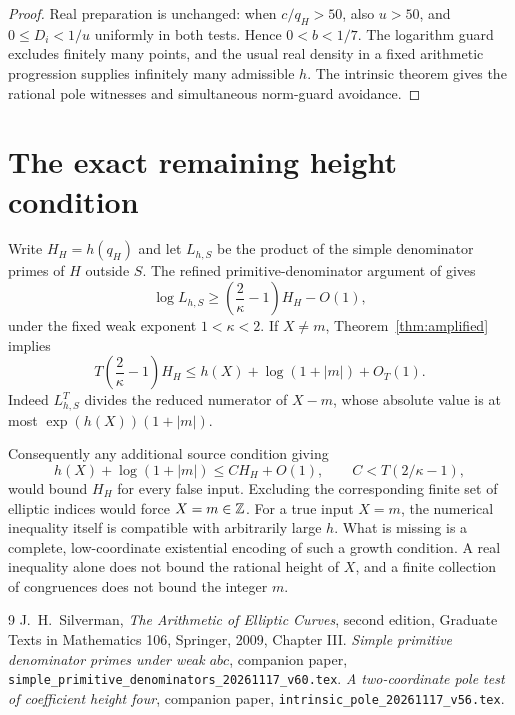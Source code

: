 \documentclass[11pt,a4paper]{article}
\begin{document}
\begin{proof}
Real preparation is unchanged: when $c/q_H>50$, also $u>50$,
and $0\le D_i<1/u$ uniformly in both tests. Hence $0<b<1/7$.
The logarithm guard excludes finitely many points, and the
usual real density in a fixed arithmetic progression supplies
infinitely many admissible $h$. The intrinsic theorem gives
the rational pole witnesses and simultaneous norm-guard avoidance.
\end{proof}

\section{The exact remaining height condition}

Write $H_H=h(q_H)$ and let $L_{h,S}$ be the product of the
simple denominator primes of $H$ outside $S$. The refined
primitive-denominator argument of \cite{Simple} gives
\[
 \log L_{h,S}\ge\left(\frac2\kappa-1\right)H_H-O(1),
\]
under the fixed weak exponent $1<\kappa<2$.
If $X\ne m$, Theorem~\ref{thm:amplified} implies
\begin{equation}\label{eq:remaining}
 T\left(\frac2\kappa-1\right)H_H
           \le h(X)+\log(1+|m|)+O_T(1).
\end{equation}
Indeed $L_{h,S}^T$ divides the reduced numerator of $X-m$,
whose absolute value is at most
$\exp(h(X))(1+|m|)$.

Consequently any additional source condition giving
\[
       h(X)+\log(1+|m|)\le C H_H+O(1),
       \qquad C<T(2/\kappa-1),
\]
would bound $H_H$ for every false input. Excluding the
corresponding finite set of elliptic indices would force
$X=m\in\mathbb Z$. For a true input $X=m$, the numerical inequality
itself is compatible with arbitrarily large $h$.
What is missing is a complete, low-coordinate existential
encoding of such a growth condition. A real inequality alone
does not bound the rational height of $X$, and a finite
collection of congruences does not bound the integer $m$.

\begin{thebibliography}{9}
J.~H.~Silverman, \emph{The Arithmetic of Elliptic Curves},
second edition, Graduate Texts in Mathematics 106, Springer, 2009,
Chapter III.
\emph{Simple primitive denominator primes under weak
$abc$}, companion paper, \nolinkurl{simple_primitive_denominators_20261117_v60.tex}.
\emph{A two-coordinate pole test of coefficient
height four}, companion paper, \nolinkurl{intrinsic_pole_20261117_v56.tex}.
\end{thebibliography}
\end{document}
